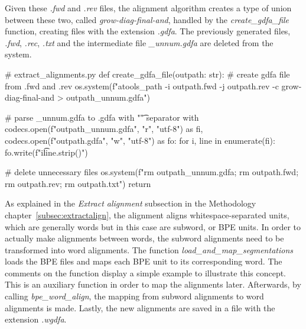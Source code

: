 Given these \emph{.fwd} and \emph{.rev} files, the alignment algorithm creates a type of union between these two, called \emph{grow-diag-final-and}, handled by the \emph{create\_gdfa\_file} function, creating files with the extension \emph{.gdfa}. The previously generated files, \emph{.fwd}, \emph{.rec}, \emph{.txt} and the intermediate file \emph{\_unnum.gdfa} are deleted from the system.

\begin{python}
# extract_alignments.py
def create_gdfa_file(outpath: str):
  # create gdfa file from .fwd and .rev
  os.system(f"{atools_path} -i {outpath}.fwd -j {outpath}.rev -c grow-diag-final-and > {outpath}_unnum.gdfa")

  # parse _unnum.gdfa to .gdfa with "\t" separator
  with codecs.open(f"{outpath}_unnum.gdfa", "r", "utf-8") as fi, codecs.open(f"{outpath}.gdfa", "w", "utf-8") as fo:
    for i, line in enumerate(fi):
      fo.write(f"{i}\t{line.strip()}\n")

  # delete unnecessary files
  os.system(f"rm {outpath}_unnum.gdfa; rm {outpath}.fwd; rm {outpath}.rev; rm {outpath}.txt")
  return
\end{python}

As explained in the \textit{Extract alignment} subsection in the Methodology chapter~\ref{subsec:extractalign}, the alignment aligns whitespace-separated units, which are generally words but in this case are subword, or BPE units. In order to actually make alignments between words, the subword alignments need to be transformed into word alignments. The function \emph{load\_and\_map\_segmentations} loads the BPE files and maps each BPE unit to its corresponding word. The comments on the function display a simple example to illustrate this concept. This is an auxiliary function in order to map the alignments later. Afterwards, by calling \emph{bpe\_word\_align}, the mapping from subword alignments to word alignments is made. Lastly, the new alignments are saved in a file with the extension \emph{.wgdfa}.

